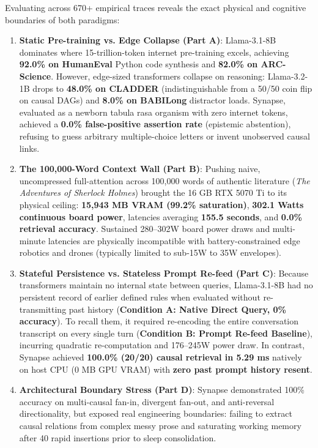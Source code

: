 \documentclass[11pt,a4paper]{article}
\begin{document}
\begin{abstractbox}
  Evaluating across 670+ empirical traces reveals the exact physical and cognitive boundaries of both paradigms:
  \begin{enumerate}[leftmargin=1.5em, itemsep=1pt, topsep=2pt]
    \item \textbf{Static Pre-training vs. Edge Collapse (Part A)}: Llama-3.1-8B dominates where 15-trillion-token internet pre-training excels, achieving \textbf{92.0\% on HumanEval} Python code synthesis and \textbf{82.0\% on ARC-Science}. However, edge-sized transformers collapse on reasoning: Llama-3.2-1B drops to \textbf{48.0\% on CLADDER} (indistinguishable from a 50/50 coin flip on causal DAGs) and \textbf{8.0\% on BABILong} distractor loads. Synapse, evaluated as a newborn tabula rasa organism with zero internet tokens, achieved a \textbf{0.0\% false-positive assertion rate} (epistemic abstention), refusing to guess arbitrary multiple-choice letters or invent unobserved causal links.
    \item \textbf{The 100,000-Word Context Wall (Part B)}: Pushing naive, uncompressed full-attention across 100,000 words of authentic literature (\textit{The Adventures of Sherlock Holmes}) brought the 16 GB RTX 5070 Ti to its physical ceiling: \textbf{15,943 MB VRAM (99.2\% saturation)}, \textbf{302.1 Watts continuous board power}, latencies averaging \textbf{155.5 seconds}, and \textbf{0.0\% retrieval accuracy}. Sustained 280--302W board power draws and multi-minute latencies are physically incompatible with battery-constrained edge robotics and drones (typically limited to sub-15W to 35W envelopes).
    \item \textbf{Stateful Persistence vs. Stateless Prompt Re-feed (Part C)}: Because transformers maintain no internal state between queries, Llama-3.1-8B had no persistent record of earlier defined rules when evaluated without re-transmitting past history (\textbf{Condition A: Native Direct Query, 0\% accuracy}). To recall them, it required re-encoding the entire conversation transcript on every single turn (\textbf{Condition B: Prompt Re-feed Baseline}), incurring quadratic re-computation and 176--245W power draw. In contrast, Synapse achieved \textbf{100.0\% (20/20) causal retrieval in 5.29 ms} natively on host CPU (0 MB GPU VRAM) with \textbf{zero past prompt history resent}.
    \item \textbf{Architectural Boundary Stress (Part D)}: Synapse demonstrated 100\% accuracy on multi-causal fan-in, divergent fan-out, and anti-reversal directionality, but exposed real engineering boundaries: failing to extract causal relations from complex messy prose and saturating working memory after 40 rapid insertions prior to sleep consolidation.

\end{enumerate}
\end{abstractbox}
\end{document}
